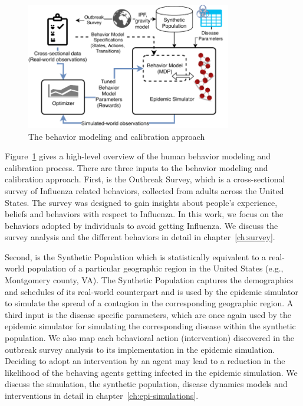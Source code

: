 \documentclass[doublespace,draft]{VTthesis}
\begin{document}
    \begin{figure}
    \centering
    \includegraphics[width=0.8\textwidth]{figures/calibrationproc.pdf}
    \caption{The behavior modeling and calibration approach}
    \label{fig:calib-proc}
    \end{figure}
    
    Figure~\ref{fig:calib-proc} gives a high-level overview of the human behavior modeling and calibration process. There are three inputs to the behavior modeling and calibration approach. First, is the Outbreak Survey, which is a cross-sectional survey of Influenza related behaviors, collected from adults across the United States. The survey was designed to gain insights about people’s experience, beliefs and behaviors with respect to Influenza. In this work, we focus on the behaviors adopted by individuals to avoid getting Influenza. We discuss the survey analysis and the different behaviors in detail in chapter~\ref{ch:survey}.
    
    Second, is the Synthetic Population which is statistically equivalent to a real-world population of a particular geographic region in the United States (e.g., Montgomery county, VA). The Synthetic Population captures the demographics and schedules of its real-world counterpart and is used by the epidemic simulator to simulate the spread of a contagion in the corresponding geographic region. A third input is the disease specific parameters, which are once again used by the epidemic simulator for simulating the corresponding disease within the synthetic population. We also map each behavioral action (intervention) discovered in the outbreak survey analysis to its implementation in the epidemic simulation. Deciding to adopt an intervention by an agent may lead to a reduction in the likelihood of the behaving agents getting infected in the epidemic simulation. We discuss the simulation, the synthetic population, disease dynamics models and interventions in detail in chapter~\ref{ch:epi-simulations}. 
    
\end{document}
